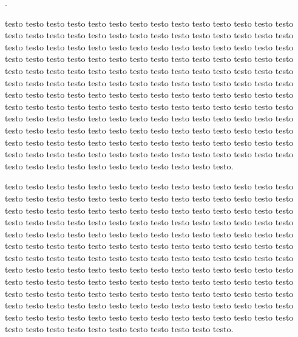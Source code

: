 \documentclass[11pt,a4paper]{book}
\begin{document}
\begin{pages}

\begin{Leftside}
\beginnumbering
 
\pstart {}.\pend

\pstart {}testo testo testo testo testo testo testo testo testo testo testo testo testo testo testo testo testo testo testo testo testo testo testo testo testo testo testo testo testo testo testo testo testo testo testo testo testo testo testo testo testo testo testo testo testo testo testo testo testo testo testo testo testo testo testo testo testo testo testo testo testo testo testo testo testo testo testo testo testo testo testo testo testo testo testo testo testo testo testo testo testo testo testo testo testo testo testo testo testo testo testo testo testo testo testo testo testo testo testo testo testo testo testo testo testo testo testo testo testo testo testo testo testo testo testo testo testo testo testo testo testo testo testo testo testo testo testo testo testo testo testo testo testo testo testo testo testo testo testo testo testo testo testo testo testo testo testo testo testo testo testo testo testo testo testo testo testo testo testo testo testo testo testo testo testo testo testo testo testo testo testo testo testo testo testo testo testo testo testo.\pend

\pstart testo testo testo testo testo testo testo testo testo testo testo testo testo testo testo testo testo testo testo testo testo testo testo testo testo testo testo testo testo testo testo testo testo testo testo testo testo testo testo testo testo testo testo testo testo testo testo testo testo testo testo testo testo testo testo testo testo testo testo testo testo testo testo testo testo testo testo testo testo testo testo testo testo testo testo testo testo testo testo testo testo testo testo testo testo testo testo testo testo testo testo testo testo testo testo testo testo testo testo testo testo testo testo testo testo testo testo testo testo testo testo testo testo testo testo testo testo testo testo testo testo testo testo testo testo testo testo testo testo testo testo testo testo testo testo testo testo testo testo testo testo testo testo testo testo testo testo testo testo testo testo testo testo testo testo testo testo testo testo testo testo testo testo testo testo testo testo testo testo testo testo testo testo testo testo testo testo testo testo.\pend


\end{Leftside}
\end{pages}
\end{document}
